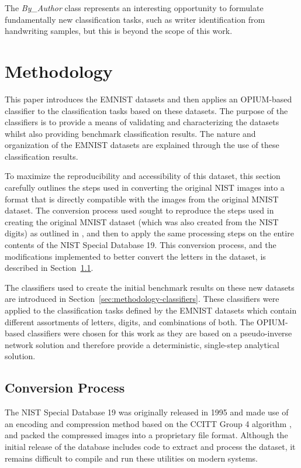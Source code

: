 \documentclass[conference]{IEEEtran}
\begin{document}
The \textit{By\_Author} class represents an interesting opportunity to formulate fundamentally new classification tasks, such as writer identification from handwriting samples, but this is beyond the scope of this work.

\section{Methodology}
\label{sec:methodology}

This paper introduces the EMNIST datasets and then applies an OPIUM-based classifier to the classification tasks based on these datasets. The purpose of the classifiers is to provide a means of validating and characterizing the datasets whilst also providing benchmark classification results. The nature and organization of the EMNIST datasets are explained through the use of these classification results.

To maximize the reproducibility and accessibility of this dataset, this section carefully outlines the steps used in converting the original NIST images into a format that is directly compatible with the images from the original MNIST dataset. The conversion process used sought to reproduce the steps used in creating the original MNIST dataset (which was also created from the NIST digits) as outlined in \cite{LeCun1998}, and then to apply the same processing steps on the entire contents of the NIST Special Database 19. This conversion process, and the modifications implemented to better convert the letters in the dataset, is described in Section~\ref{sec:dataset-conversion}. 

The classifiers used to create the initial benchmark results on these new datasets are introduced in Section~\ref{sec:methodology-classifiers}. These classifiers were applied to the classification tasks defined by the EMNIST datasets which contain different assortments of letters, digits, and combinations of both. The OPIUM-based classifiers were chosen for this work as they are based on a pseudo-inverse network solution and therefore provide a deterministic, single-step analytical solution. 

\subsection{Conversion Process}
\label{sec:dataset-conversion}

The NIST Special Database 19 was originally released in 1995 and made use of an encoding and compression method based on the CCITT Group 4 algorithm \cite{Urban1992}, and packed the compressed images into a proprietary file format. Although the initial release of the database includes code to extract and process the dataset, it remains difficult to compile and run these utilities on modern systems.
\end{document}
